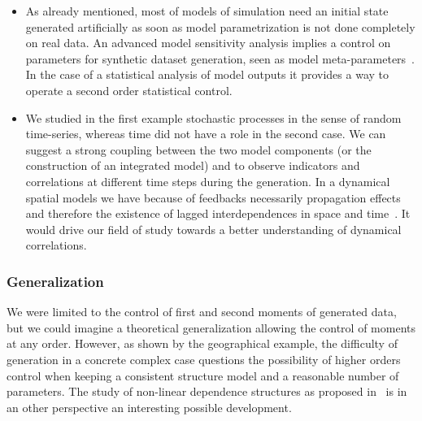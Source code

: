 \begin{itemize}
\item As already mentioned, most of models of simulation need an initial state generated artificially as soon as model parametrization is not done completely on real data. An advanced model sensitivity analysis implies a control on parameters for synthetic dataset generation, seen as model meta-parameters~\cite{cottineau2015revisiting}. In the case of a statistical analysis of model outputs it provides a way to operate a second order statistical control.
\item We studied in the first example stochastic processes in the sense of random time-series, whereas time did not have a role in the second case. We can suggest a strong coupling between the two model components (or the construction of an integrated model) and to observe indicators and correlations at different time steps during the generation. In a dynamical spatial models we have because of feedbacks necessarily propagation effects and therefore the existence of lagged interdependences in space and time~\cite{pigozzi1980interurban}. It would drive our field of study towards a better understanding of dynamical correlations.
\end{itemize}




\subsubsection*{Generalization}

We were limited to the control of first and second moments of generated data, but we could imagine a theoretical generalization allowing the control of moments at any order. However, as shown by the geographical example, the difficulty of generation in a concrete complex case questions the possibility of higher orders control when keeping a consistent structure model and a reasonable number of parameters. The study of non-linear dependence structures as proposed in~\cite{chicheportiche2013nested} is in an other perspective an interesting possible development.






